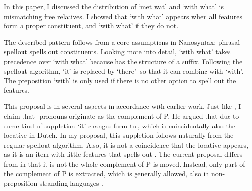 \documentclass[12pt]{article}
\begin{document}
In this paper, I discussed the distribution of  `met wat' and  `with what' is mismatching free relatives. I showed that  `with what' appears when all features form a proper constituent, and  `with what' if they do not.

The described pattern follows from a core assumptions in Nanosyntax: phrasal spellout spells out constituents. Looking more into detail,  `with what' takes precedence over  `with what' because  has the structure of a suffix. Following the spellout algorithm,  `it' is replaced by  `there', so that it can combine with  `with'. The preposition  `with' is only used if there is no other option to spell out the features.

This proposal is in several aspects in accordance with earlier work.
Just like \citet{riemsdijk1978}, I claim that -pronouns originate as the complement of P. He argued that due to some kind of suppletion  `it' changes form to , which is coincidentally also the locative in Dutch. In my proposal, this suppletion follows naturally from the regular spellout algorithm. Also, it is not a coincidence that the locative appears, as it is an item with little features that spells out .
The current proposal differs from \citet{riemsdijk1978} in that it is not the whole complement of P is moved. Instead, only part of the complement of P is extracted, which is generally allowed, also in non-preposition stranding languages \citep{abels2003diss}.



\printbibliography
\end{document}
